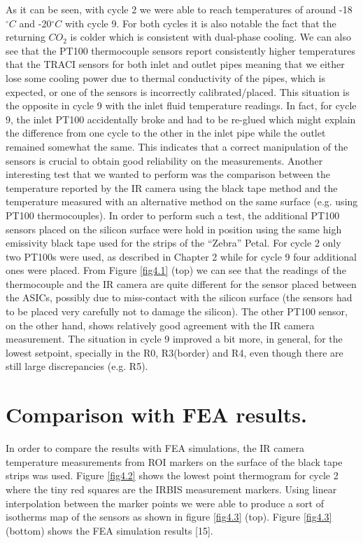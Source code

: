 		As it can be seen, with cycle 2 we were able to reach temperatures of around -18\space$^\circ C$ and -20\space$^\circ C$ with cycle 9. For both cycles it is also notable the fact that the returning $CO_{2}$ is colder which is consistent with dual-phase cooling. We can also see that the PT100 thermocouple sensors report consistently higher temperatures that the TRACI sensors for both inlet and outlet pipes  meaning that we either lose some cooling power due to thermal conductivity of the pipes, which is expected, or one of the sensors is incorrectly calibrated/placed. This situation is the opposite in cycle 9 with the inlet fluid temperature readings. In fact, for cycle 9, the inlet PT100 accidentally broke and had to be re-glued which might explain the difference from one cycle to the other in the inlet pipe while the outlet remained somewhat the same. This indicates that a correct manipulation of the sensors is crucial to obtain good reliability on the measurements.
		Another interesting test that we wanted to perform was the comparison between the temperature reported by the IR camera using the black tape method and the temperature measured with an alternative method on the same surface (e.g. using PT100 thermocouples). In order to perform such a test, the additional PT100 sensors placed on the silicon surface were hold in position using the same high emissivity black tape used for the strips of the “Zebra” Petal. For cycle 2 only two PT100s were used, as described in Chapter 2 while for cycle 9 four additional ones were placed. From Figure \ref{fig4.1} (top) we can see that the readings of the thermocouple and the IR camera are quite different for the sensor placed between the ASICs, possibly due to miss-contact with the silicon surface (the sensors had to be placed very carefully not to damage the silicon). The other PT100 sensor, on the other hand, shows relatively good agreement with the IR camera measurement. The situation in cycle 9 improved a bit more, in general, for the lowest setpoint, specially in the R0, R3(border) and R4, even though there are still large discrepancies (e.g. R5).
			
	
	\section{Comparison with FEA results.}\label{section4.2}
	
		In order to compare the results with FEA simulations, the IR camera temperature measurements from ROI markers on the surface of the black tape strips was used. Figure \ref{fig4.2} shows the lowest point thermogram for cycle 2 where the tiny red squares are the IRBIS measurement markers. Using linear interpolation between the marker points we were able to produce a sort of isotherms map of the sensors as shown in figure \ref{fig4.3} (top). Figure \ref{fig4.3} (bottom) shows the FEA simulation results [15].
		
